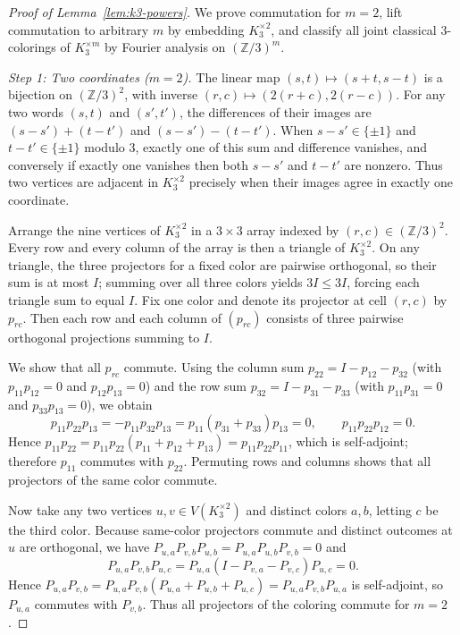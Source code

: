 \begin{proof}[Proof of Lemma~\ref{lem:k3-powers}]
We prove commutation for $m=2$, lift commutation to arbitrary $m$ by embedding $K_3^{\times2}$, and classify all joint classical $3$-colorings of $K_3^{\times m}$ by Fourier analysis on $(\mathbb Z/3)^m$.

\emph{Step 1: Two coordinates ($m=2$).} The linear map $(s,t)\mapsto(s+t,s-t)$ is a bijection on $(\mathbb Z/3)^2$, with inverse $(r,c)\mapsto(2(r+c),2(r-c))$. For any two words $(s,t)$ and $(s',t')$, the differences of their images are $(s-s')+(t-t')$ and $(s-s')-(t-t')$. When $s-s'\in\{\pm1\}$ and $t-t'\in\{\pm1\}$ modulo $3$, exactly one of this sum and difference vanishes, and conversely if exactly one vanishes then both $s-s'$ and $t-t'$ are nonzero. Thus two vertices are adjacent in $K_3^{\times2}$ precisely when their images agree in exactly one coordinate.

Arrange the nine vertices of $K_3^{\times2}$ in a $3\times3$ array indexed by $(r,c)\in(\mathbb Z/3)^2$. Every row and every column of the array is then a triangle of $K_3^{\times2}$. On any triangle, the three projectors for a fixed color are pairwise orthogonal, so their sum is at most $I$; summing over all three colors yields $3I\le 3I$, forcing each triangle sum to equal $I$. Fix one color and denote its projector at cell $(r,c)$ by $p_{rc}$. Then each row and each column of $(p_{rc})$ consists of three pairwise orthogonal projections summing to $I$.

We show that all $p_{rc}$ commute. Using the column sum $p_{22}=I-p_{12}-p_{32}$ (with $p_{11}p_{12}=0$ and $p_{12}p_{13}=0$) and the row sum $p_{32}=I-p_{31}-p_{33}$ (with $p_{11}p_{31}=0$ and $p_{33}p_{13}=0$), we obtain
\[
 p_{11}p_{22}p_{13}=-p_{11}p_{32}p_{13}=p_{11}(p_{31}+p_{33})p_{13}=0,
 \qquad
 p_{11}p_{22}p_{12}=0.
\]
Hence $p_{11}p_{22}=p_{11}p_{22}(p_{11}+p_{12}+p_{13})=p_{11}p_{22}p_{11}$, which is self-adjoint; therefore $p_{11}$ commutes with $p_{22}$. Permuting rows and columns shows that all projectors of the same color commute.

Now take any two vertices $u,v\in V(K_3^{\times2})$ and distinct colors $a,b$, letting $c$ be the third color. Because same-color projectors commute and distinct outcomes at $u$ are orthogonal, we have $P_{u,a}P_{v,b}P_{u,b}=P_{u,a}P_{u,b}P_{v,b}=0$ and
\[
 P_{u,a}P_{v,b}P_{u,c}=P_{u,a}(I-P_{v,a}-P_{v,c})P_{u,c}=0.
\]
Hence $P_{u,a}P_{v,b}=P_{u,a}P_{v,b}(P_{u,a}+P_{u,b}+P_{u,c})=P_{u,a}P_{v,b}P_{u,a}$ is self-adjoint, so $P_{u,a}$ commutes with $P_{v,b}$. Thus all projectors of the coloring commute for $m=2$.


\end{proof}
